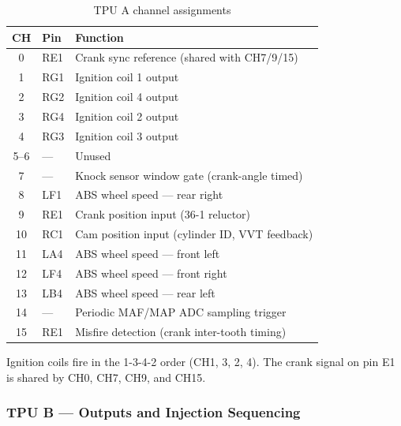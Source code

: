 \documentclass[a4paper,11pt]{article}
\renewcommand{\_}{\oldunderscore\allowbreak}
\begin{document}
\begin{table}[H]
\centering
\begin{tabular}{clp{8.5cm}}
\toprule
\textbf{CH} & \textbf{Pin} & \textbf{Function} \\
\midrule
0  & RE1  & Crank sync reference (shared with CH7/9/15) \\
1  & RG1  & Ignition coil 1 output \\
2  & RG2  & Ignition coil 4 output \\
3  & RG4  & Ignition coil 2 output \\
4  & RG3  & Ignition coil 3 output \\
5--6 & --- & Unused \\
7  & ---  & Knock sensor window gate (crank-angle timed) \\
8  & LF1  & ABS wheel speed --- rear right \\
9  & RE1  & Crank position input (36-1 reluctor) \\
10 & RC1  & Cam position input (cylinder ID, VVT feedback) \\
11 & LA4  & ABS wheel speed --- front left \\
12 & LF4  & ABS wheel speed --- front right \\
13 & LB4  & ABS wheel speed --- rear left \\
14 & ---  & Periodic MAF/MAP ADC sampling trigger \\
15 & RE1  & Misfire detection (crank inter-tooth timing) \\
\bottomrule
\end{tabular}
\caption{TPU A channel assignments}
\end{table}

Ignition coils fire in the 1-3-4-2 order (CH1, 3, 2, 4).
The crank signal on pin E1 is shared by CH0, CH7, CH9, and CH15.

\subsubsection*{TPU B --- Outputs and Injection Sequencing}
\end{document}
